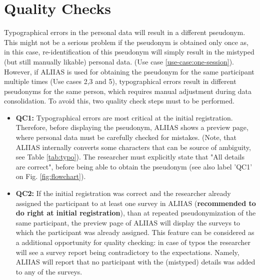 \section{Quality Checks}
\label{section:qc}
Typographical errors in the personal data will result in a different pseudonym. This might not be a serious problem if the pseudonym is obtained only once as, in this case, re-identification of this pseudonym will simply result in the mistyped (but still manually likable) personal data. (Use case \ref{use-case:one-session}).
However, if ALIIAS is used for obtaining the pseudonym for the same participant multiple times (Use cases 2,3 and 5), typographical errors result in different pseudonyms for the same person, which requires manual adjustment during data consolidation.
To avoid this, two quality check steps must to be performed.
\begin{itemize}
    \item \textbf{QC1:} Typographical errors are most critical at the initial registration. Therefore, before displaying the pseudonym, ALIIAS shows a preview page, where personal data must be carefully checked for mistakes. (Note, that ALIIAS internally converts some characters that can be source of ambiguity, see Table \ref{tab:typo}). The researcher must explicitly state that "All details are correct", before being able to obtain the pseudonym (see also label 'QC1' on Fig. \ref{fig:flowchart}).
    \item \textbf{QC2:} If the initial registration was correct and the researcher already assigned the participant to at least one survey in ALIIAS (\textbf{recommended to do right at initial registration}), than at repeated pseudonymization of the same participant, the preview page of ALIIAS will display the surveys to which the participant was already assigned. This feature can be considered as a additional opportunity for quality checking: in case of typos the researcher will see a survey report being contradictory to the expectations. Namely, ALIIAS will report that no participant with the (mistyped) details was added to any of the surveys.
\end{itemize}

